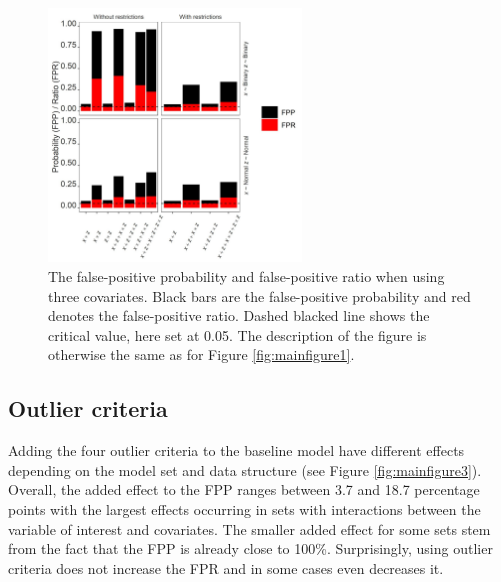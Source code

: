 \begin{figure}[hbt!]
\includegraphics[width=0.6\textwidth]{R/Analysis/Result/Figures/Figure1C.jpeg}
\centering
\caption{The false-positive probability and false-positive ratio when using three covariates. Black bars are the false-positive probability and red denotes the false-positive ratio. Dashed blacked line shows the critical value, here set at 0.05. The description of the figure is otherwise the same as for Figure \ref{fig:mainfigure1}.}
\label{fig:mainfigure2}
\end{figure}

\subsection{Outlier criteria}
Adding the four outlier criteria to the baseline model have different effects depending on the model set and data structure (see Figure \ref{fig:mainfigure3}). Overall, the added effect to the FPP ranges between 3.7 and 18.7 percentage points with the largest effects occurring in sets with interactions between the variable of interest and covariates. The smaller added effect for some sets stem from the fact that the FPP is already close to 100\%. Surprisingly, using outlier criteria does not increase the FPR and in some cases even decreases it. 

